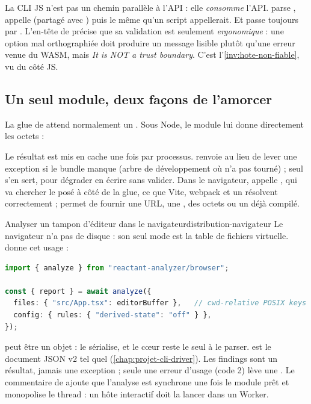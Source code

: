 La CLI JS n'est pas un chemin parallèle à l'API : elle \emph{consomme} l'API.  parse , appelle  (partagé avec ) puis le même  qu'un script appellerait. Et  passe toujours par . L'en-tête de  précise que sa validation est seulement \emph{ergonomique} : une option mal orthographiée doit produire un message lisible plutôt qu'une erreur  venue du WASM, mais \og \emph{It is NOT a trust boundary}\fg{}. C'est l'\cref{inv:hote-non-fiable}, vu du côté JS.

\subsection{Un seul module, deux façons de l'amorcer}

La glue  de  attend normalement un . Sous Node, le module  lui donne directement les octets :


Le résultat est mis en cache une fois par processus.  renvoie  au lieu de lever une exception si le bundle manque (arbre de développement où  n'a pas tourné) ; seul  s'en sert, pour dégrader en \og écrire sans valider\fg{}. Dans le navigateur,  appelle , qui va chercher le  posé à côté de la glue, ce que Vite, webpack et un  résolvent correctement ;  permet de fournir une URL, une , des octets ou un  déjà compilé.

\begin{exemple}{Analyser un tampon d'éditeur dans le navigateur}{distribution-navigateur}
Le navigateur n'a pas de disque : son seul mode est la table de fichiers virtuelle.  donne cet usage :
\begin{lstlisting}[language=TypeScript,caption={Usage navigateur de l'API (extrait de \file{docs/usage.md}, élagué)}]
import { analyze } from "reactant-analyzer/browser";

const { report } = await analyze({
  files: { "src/App.tsx": editorBuffer },   // cwd-relative POSIX keys
  config: { rules: { "derived-state": "off" } },
});
\end{lstlisting}
 peut être un objet :  le sérialise, et le cœur reste le seul à le parser.  est le document JSON v2 tel quel (\cref{chap:projet-cli-driver}). Les findings sont un résultat, jamais une exception ; seule une erreur d'usage (code 2) lève une . Le commentaire de  ajoute que l'analyse est synchrone une fois le module prêt et monopolise le thread : un hôte interactif doit la lancer dans un Worker.
\end{exemple}

